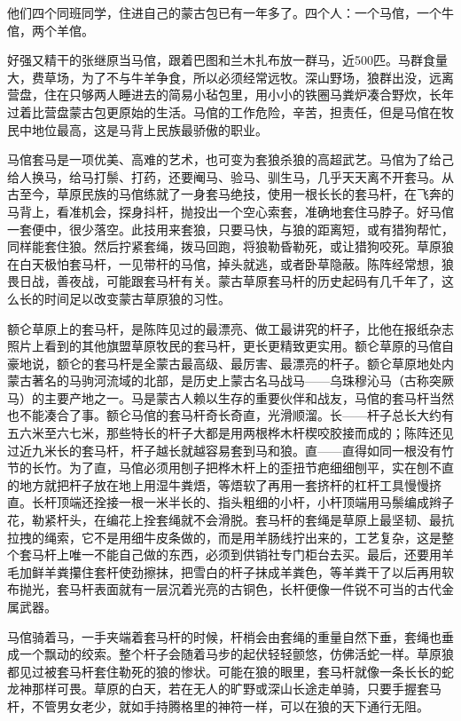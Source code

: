 \par 
\par 他们四个同班同学，住进自己的蒙古包已有一年多了。四个人：一个马倌，一个牛倌，两个羊倌。
\par 好强又精干的张继原当马倌，跟着巴图和兰木扎布放一群马，近500匹。马群食量大，费草场，为了不与牛羊争食，所以必须经常远牧。深山野场，狼群出没，远离营盘，住在只够两人睡进去的简易小毡包里，用小小的铁圈马粪炉凑合野炊，长年过着比营盘蒙古包更原始的生活。马倌的工作危险，辛苦，担责任，但是马倌在牧民中地位最高，这是马背上民族最骄傲的职业。
\par 马倌套马是一项优美、高难的艺术，也可变为套狼杀狼的高超武艺。马倌为了给己给人换马，给马打鬃、打药，还要阉马、验马、驯生马，几乎天天离不开套马。从古至今，草原民族的马倌练就了一身套马绝技，使用一根长长的套马杆，在飞奔的马背上，看准机会，探身抖杆，抛投出一个空心索套，准确地套住马脖子。好马倌一套便中，很少落空。此技用来套狼，只要马快，与狼的距离短，或有猎狗帮忙，同样能套住狼。然后拧紧套绳，拨马回跑，将狼勒昏勒死，或让猎狗咬死。草原狼在白天极怕套马杆，一见带杆的马倌，掉头就逃，或者卧草隐蔽。陈阵经常想，狼畏日战，善夜战，可能跟套马杆有关。蒙古草原套马杆的历史起码有几千年了，这么长的时间足以改变蒙古草原狼的习性。
\par 额仑草原上的套马杆，是陈阵见过的最漂亮、做工最讲究的杆子，比他在报纸杂志照片上看到的其他旗盟草原牧民的套马杆，更长更精致更实用。额仑草原的马倌自豪地说，额仑的套马杆是全蒙古最高级、最厉害、最漂亮的杆子。额仑草原地处内蒙古著名的马驹河流域的北部，是历史上蒙古名马战马——乌珠穆沁马（古称突厥马）的主要产地之一。马是蒙古人赖以生存的重要伙伴和战友，马倌的套马杆当然也不能凑合了事。额仑马倌的套马杆奇长奇直，光滑顺溜。长——杆子总长大约有五六米至六七米，那些特长的杆子大都是用两根桦木杆楔咬胶接而成的；陈阵还见过近九米长的套马杆，杆子越长就越容易套到马和狼。直——直得如同一根没有竹节的长竹。为了直，马倌必须用刨子把桦木杆上的歪扭节疤细细刨平，实在刨不直的地方就把杆子放在地上用湿牛粪焐，等焐软了再用一套挤杆的杠杆工具慢慢挤直。长杆顶端还拴接一根一米半长的、指头粗细的小杆，小杆顶端用马鬃编成辫子花，勒紧杆头，在编花上拴套绳就不会滑脱。套马杆的套绳是草原上最坚韧、最抗拉拽的绳索，它不是用细牛皮条做的，而是用羊肠线拧出来的，工艺复杂，这是整个套马杆上唯一不能自己做的东西，必须到供销社专门柜台去买。最后，还要用羊毛加鲜羊粪攥住套杆使劲擦抹，把雪白的杆子抹成羊粪色，等羊粪干了以后再用软布抛光，套马杆表面就有一层沉着光亮的古铜色，长杆便像一件锐不可当的古代金属武器。
\par 马倌骑着马，一手夹端着套马杆的时候，杆梢会由套绳的重量自然下垂，套绳也垂成一个飘动的绞索。整个杆子会随着马步的起伏轻轻颤悠，仿佛活蛇一样。草原狼都见过被套马杆套住勒死的狼的惨状。可能在狼的眼里，套马杆就像一条长长的蛇龙神那样可畏。草原的白天，若在无人的旷野或深山长途走单骑，只要手握套马杆，不管男女老少，就如手持腾格里的神符一样，可以在狼的天下通行无阻。
